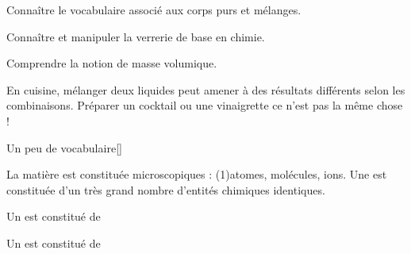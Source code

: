 \teteSndCorp

\vspace*{-36pt}


\begin{objectifs}
  \item Connaître le vocabulaire associé aux corps purs et mélanges.
  \item Connaître et manipuler la verrerie de base en chimie.
  \item Comprendre la notion de masse volumique.
\end{objectifs}

\begin{contexte}
  En cuisine, mélanger deux liquides peut amener à des résultats différents selon les combinaisons.
  Préparer un cocktail ou une vinaigrette ce n'est pas la même chose !
  
\end{contexte}


\begin{doc}{Un peu de vocabulaire}[\label{doc:vocabulaire_melange}]
  \begin{importants}
    La matière est constituée  microscopiques : \texteTrou(1){atomes, molécules, ions.}
    Une  est constituée d’un très grand nombre d’entités chimiques
identiques.
  \end{importants}
    
  \begin{importants}
    \begin{listePoints}
      \item Un  est constitué de 
      \item Un  est constitué de 
    \end{listePoints}
  \end{importants}
\end{doc}

